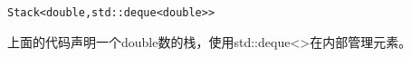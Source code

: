 \begin{lstlisting}[style=styleCXX]
Stack<double,std::deque<double>>
\end{lstlisting}

上面的代码声明一个double数的栈，使用std::deque<>在内部管理元素。
















